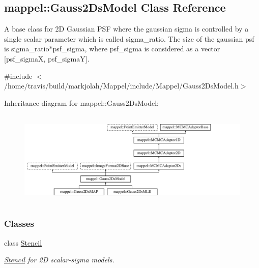 \hypertarget{classmappel_1_1Gauss2DsModel}{}\subsection{mappel\+:\+:Gauss2\+Ds\+Model Class Reference}
\label{classmappel_1_1Gauss2DsModel}


A base class for 2D Gaussian P\+SF where the gaussian sigma is controlled by a single scalar parameter which is called sigma\+\_\+ratio. The size of the gaussian psf is sigma\+\_\+ratio$\ast$psf\+\_\+sigma, where psf\+\_\+sigma is considered as a vector \mbox{[}psf\+\_\+sigmaX, psf\+\_\+sigmaY\mbox{]}.  




{\ttfamily \#include $<$/home/travis/build/markjolah/\+Mappel/include/\+Mappel/\+Gauss2\+Ds\+Model.\+h$>$}

Inheritance diagram for mappel\+:\+:Gauss2\+Ds\+Model\+:\begin{figure}[H]
\begin{center}
\leavevmode
\includegraphics[height=4.615384cm]{classmappel_1_1Gauss2DsModel}
\end{center}
\end{figure}
\subsubsection*{Classes}
\begin{DoxyCompactItemize}
\item 
class \hyperlink{classmappel_1_1Gauss2DsModel_1_1Stencil}{Stencil}
\begin{DoxyCompactList}\small\item\em \hyperlink{classmappel_1_1Gauss2DsModel_1_1Stencil}{Stencil} for 2D scalar-\/sigma models. \end{DoxyCompactList}\end{DoxyCompactItemize}
